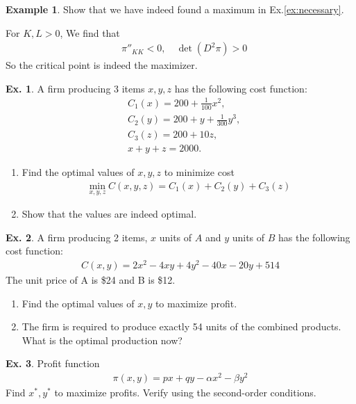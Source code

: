 \documentclass[10pt,a4paper]{book}
\theoremstyle{definition}\newtheorem{definition}{Definition}
\theoremstyle{definition}\newtheorem{fact}{Fact}
\theoremstyle{definition}\newtheorem{ex}{Ex.}
\theoremstyle{definition}\newtheorem{project}{Project}
\theoremstyle{definition}\newtheorem{problem}{Problem}
\theoremstyle{definition}\newtheorem{example}{Example}
\numberwithin{theorem}{chapter}
\numberwithin{corollary}{chapter}
\numberwithin{assumption}{chapter}
\numberwithin{definition}{chapter}
\numberwithin{prop}{chapter}
\numberwithin{notation}{chapter}
\numberwithin{problem}{chapter}
\numberwithin{example}{chapter}
\numberwithin{fact}{chapter}
\numberwithin{ex}{chapter}
\begin{document}
	\begin{example}
		Show that we have indeed found a maximum in Ex.\ref{ex:necessary}.
		
		For $K,L > 0$, We find that
		\begin{align*}
			& \pi''_{KK} < 0, \ 
			& \det(D^2 \pi) > 0 
		\end{align*}
		So the critical point is indeed the maximizer.
	\end{example}
	
	\begin{ex}
		A firm producing 3 items $x,y,z$ has the following cost function:
		\begin{align*}
			& C_1 (x) = 200 + \frac{1}{100} x^2,     \\
			& C_2 (y) = 200 + y + \frac{1}{300} y^3, \\
			& C_3 (z) = 200 + 10z,                   \\
			& x + y + z = 2000.                      
		\end{align*}
		\begin{enumerate}
			\item Find the optimal values of $x,y,z$ to minimize cost
			\begin{align*}
				\min_{x,y,z} C(x,y,z) = C_1 (x) + C_2 (y) + C_3 (z) 
			\end{align*}
			\item Show that the values are indeed optimal.
		\end{enumerate}
	\end{ex}
	
	\begin{ex}
		A firm producing 2 items, $x$ units of $A$ and $y$ units of $B$ has the following cost function:
		\begin{align*}
			C(x,y) = 2x^2 - 4xy + 4y^2 - 40 x - 20 y + 514 
		\end{align*}
		The unit price of A is \$24 and B is \$12.
		\begin{enumerate}
			\item Find the optimal values of $x,y$ to maximize profit.
			\item The firm is required to produce exactly 54 units of the combined products. What is the optimal production now?
		\end{enumerate}
	\end{ex}
	
	\begin{ex}
		Profit function
		\begin{align*}
			\pi (x,y) = px + qy - \alpha x^2 - \beta y^2 
		\end{align*}
		Find $x^*,y^*$ to maximize profits. Verify using the second-order conditions.
	\end{ex}
	
\end{document}
